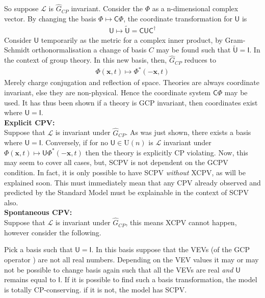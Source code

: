 So suppose $\mathcal{L}$ is $\hat{G}_{CP}$ invariant. Consider the $\Phi$ as a n-dimensional complex vector. By changing the basis $\Phi \mapsto \mathsf{C}\Phi$, the coordinate transformation for $\mathsf{U}$ is 
\begin{align*}
\mathsf{U} \mapsto \tilde{\mathsf{U}}= \mathsf{CU}\mathsf{C}^\dagger
\end{align*}
Consider $\mathsf{U}$ temporarily as the metric for a complex inner product, by Gram-Schmidt orthonormalisation a change of basis $C$ may be found such that $\tilde{\mathsf{U}}=\mathsf{I}$. In the context of group theory. In this new basis, then, $\hat{G}_{CP}$ reduces to
\begin{align*}
\Phi(\mathbf{x},t) \mapsto \Phi^*(-\mathbf{x},t)
\end{align*}
Merely charge conjugation and reflection of space. Theories are always coordinate invariant, else they are non-physical. Hence the coordinate system $\mathsf{C}\Phi$ may be used. It has thus been shown if a theory is GCP invariant, then coordinates exist where $\mathsf{U}=\mathsf{I}$.\\

\textbf{Explicit CPV:}\\
Suppose that $\mathcal{L}$ is invariant under $\hat{G}_{CP}$. As was just shown, there exists a basis where $\mathsf{U}=\mathsf{I}$. Conversely, if for no $\mathsf{U}\in\mathrm{U}(n)$ is $\mathcal{L}$ invariant under $\Phi(\mathbf{x},t) \mapsto \mathsf{U}\Phi^*(-\mathbf{x},t)$ then the theory is explicitly CP violating. Now, this may seem to cover all cases, but, SCPV is not dependent on the GCPV condition. In fact, it is only possible to have SCPV \textit{without} XCPV, as will be explained soon. This must immediately mean that any CPV already observed and predicted by the Standard Model must be explainable in the context of SCPV also.\\

\textbf{Spontaneous CPV:}\\
Suppose that $\mathcal{L}$ is invariant under $\hat{G}_{CP}$, this means XCPV cannot happen, however consider the following.

Pick a basis such that $\mathsf{U}=\mathsf{I}$. In this basis suppose that the VEVs (of the GCP operator ) are not all real numbers. Depending on the VEV values it may or may not be possible to change basis again such that all the VEVs are real \textit{and} $\mathsf{U}$ remains equal to $\mathsf{I}$. If it is possible to find such a basis transformation, the model is totally CP-conserving. if it is not, the model has SCPV.


